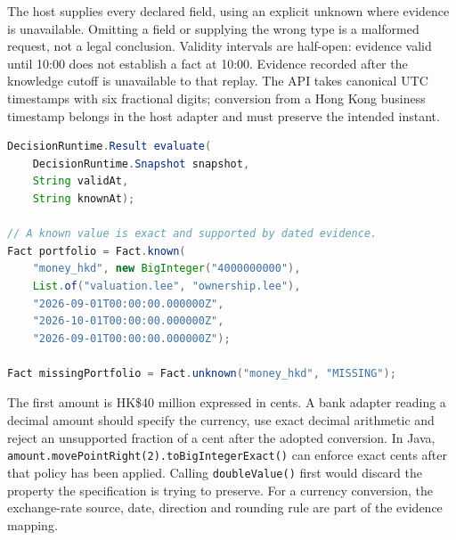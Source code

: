 The host supplies every declared field, using an explicit unknown where evidence
is unavailable. Omitting a field or supplying the wrong type is a malformed
request, not a legal conclusion. Validity intervals are half-open: evidence
valid until 10:00 does not establish a fact at 10:00. Evidence recorded after
the knowledge cutoff is unavailable to that replay. The API takes canonical UTC
timestamps with six fractional digits; conversion from a Hong Kong business
timestamp belongs in the host adapter and must preserve the intended instant.

\begin{lstlisting}[language=Java,caption={The library API and one dated monetary input.}]
DecisionRuntime.Result evaluate(
    DecisionRuntime.Snapshot snapshot,
    String validAt,
    String knownAt);

// A known value is exact and supported by dated evidence.
Fact portfolio = Fact.known(
    "money_hkd", new BigInteger("4000000000"),
    List.of("valuation.lee", "ownership.lee"),
    "2026-09-01T00:00:00.000000Z",
    "2026-10-01T00:00:00.000000Z",
    "2026-09-01T00:00:00.000000Z");

Fact missingPortfolio = Fact.unknown("money_hkd", "MISSING");
\end{lstlisting}
The first amount is HK\$40 million expressed in cents. A bank adapter reading a
decimal amount should specify the currency, use exact decimal arithmetic and
reject an unsupported fraction of a cent after the adopted conversion. In Java,
\texttt{amount.movePointRight(2).toBigIntegerExact()} can enforce exact cents
after that policy has been applied. Calling \texttt{doubleValue()} first would
discard the property the specification is trying to preserve. For a currency
conversion, the exchange-rate source, date, direction and rounding rule are part
of the evidence mapping.

